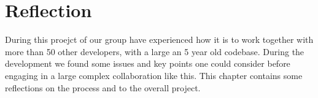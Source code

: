 \chapter{Reflection}
\label{cha:reflection}

During this proejct of \giraf our group have experienced how it is to work together with more than 50 other developers, with a large an 5 year old codebase. During the development we found some issues and key points one could consider before engaging in a large complex collaboration like this. This chapter contains some reflections on the process and to the overall project.

